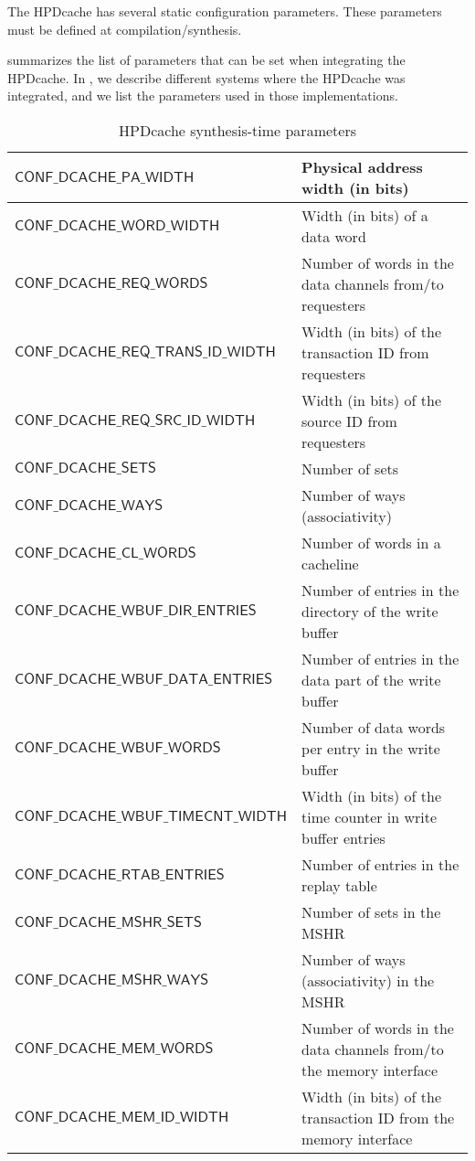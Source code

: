 \documentclass[10pt,titlepage,twoside]{book}
\begin{document}
The \ac{HPDcache} has several static configuration parameters.
These parameters must be defined at compilation/synthesis.

 summarizes the list of parameters that can be set when integrating the \ac{HPDcache}.
In , we describe different systems where the \ac{HPDcache} was integrated, and we list the parameters used in those implementations.

\begin{table}[h!]
\begin{center}
\caption{HPDcache synthesis-time parameters}%
{\footnotesize%
\begin{tabular}{p{}p{}}
\toprule%
$\mathsf{CONF\_DCACHE\_PA\_WIDTH}$ &%
Physical address width (in bits) \\
\midrule%
$\mathsf{CONF\_DCACHE\_WORD\_WIDTH}$ &%
Width (in bits) of a data word\\
\midrule%
$\mathsf{CONF\_DCACHE\_REQ\_WORDS}$ &%
Number of words in the data channels from/to requesters \\
\midrule%
$\mathsf{CONF\_DCACHE\_REQ\_TRANS\_ID\_WIDTH}$ &%
Width (in bits) of the transaction ID from requesters \\
\midrule%
$\mathsf{CONF\_DCACHE\_REQ\_SRC\_ID\_WIDTH}$ &%
Width (in bits) of the source ID from requesters \\
\midrule%
$\mathsf{CONF\_DCACHE\_SETS}$ &%
Number of sets \\
\midrule%
$\mathsf{CONF\_DCACHE\_WAYS}$ &%
Number of ways (associativity) \\
\midrule%
$\mathsf{CONF\_DCACHE\_CL\_WORDS}$ &%
Number of words in a cacheline\\
\midrule%
$\mathsf{CONF\_DCACHE\_WBUF\_DIR\_ENTRIES}$ &%
Number of entries in the directory of the write buffer \\
\midrule%
$\mathsf{CONF\_DCACHE\_WBUF\_DATA\_ENTRIES}$ &%
Number of entries in the data part of the write buffer \\
\midrule%
$\mathsf{CONF\_DCACHE\_WBUF\_WORDS}$ &%
Number of data words per entry in the write buffer \\
\midrule%
$\mathsf{CONF\_DCACHE\_WBUF\_TIMECNT\_WIDTH}$ &%
Width (in bits) of the time counter in write buffer entries \\
\midrule%
$\mathsf{CONF\_DCACHE\_RTAB\_ENTRIES}$ &%
Number of entries in the replay table \\
\midrule%
$\mathsf{CONF\_DCACHE\_MSHR\_SETS}$ &%
Number of sets in the \ac{MSHR} \\
\midrule%
$\mathsf{CONF\_DCACHE\_MSHR\_WAYS}$ &%
Number of ways (associativity) in the \ac{MSHR} \\
\midrule%
$\mathsf{CONF\_DCACHE\_MEM\_WORDS}$ &%
Number of words in the data channels from/to the memory interface \\
\midrule%
$\mathsf{CONF\_DCACHE\_MEM\_ID\_WIDTH}$ &%
Width (in bits) of the transaction ID from the memory interface \\
\end{tabular}}
\end{center}
\end{table}
\end{document}
